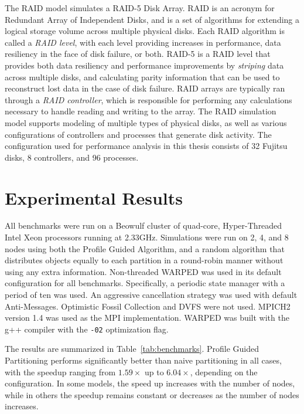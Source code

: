 \documentclass[11pt]{book}
\begin{document}
The RAID model simulates a RAID-5 Disk Array. RAID is an acronym for Redundant Array of Independent Disks, and is a set of algorithms for extending a logical storage volume across multiple physical disks. Each RAID algorithm is called a \emph{RAID level}, with each level providing increases in performance, data resiliency in the face of disk failure, or both. RAID-5 is a RAID level that provides both data resiliency and performance improvements by \emph{striping} data across multiple disks, and calculating parity information that can be used to reconstruct lost data in the case of disk failure. RAID arrays are typically ran through a \emph{RAID controller}, which is responsible for performing any calculations necessary to handle reading and writing to the array. The RAID simulation model supports modeling of multiple types of physical disks, as well as various configurations of controllers and processes that generate disk activity. The configuration used for performance analysis in this thesis consists of 32 Fujitsu disks, 8 controllers, and 96 processes.

\section{Experimental Results}

All benchmarks were run on a Beowulf cluster of quad-core, Hyper-Threaded Intel Xeon processors running at 2.33GHz. Simulations were run on 2, 4, and 8 nodes using both the Profile Guided Algorithm, and a random algorithm that distributes objects equally to each partition in a round-robin manner without using any extra information. 
Non-threaded WARPED was used in its default configuration for all benchmarks. Specifically, a periodic state manager with a period of ten was used. An aggressive cancellation strategy was used with default Anti-Messages. Optimistic Fossil Collection and DVFS were not used. MPICH2 version 1.4 was used as the MPI implementation. WARPED was built with the g++ compiler with the \texttt{-02} optimization flag.

The results are summarized in Table~\ref{tab:benchmarks}. Profile Guided Partitioning performs significantly better than naive partitioning in all cases, with the speedup ranging from \(1.59\times\) up to \(6.04\times\), depending on the configuration. In some models, the speed up increases with the number of nodes, while in others the speedup remains constant or decreases as the number of nodes increases.
\end{document}
